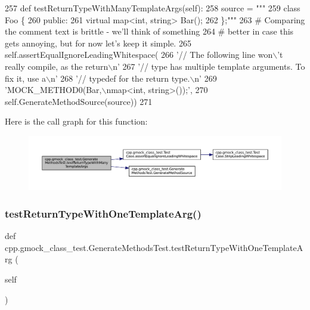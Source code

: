 \begin{DoxyCode}
257   \textcolor{keyword}{def }testReturnTypeWithManyTemplateArgs(self):
258     source = \textcolor{stringliteral}{"""}
259 \textcolor{stringliteral}{class Foo \{}
260 \textcolor{stringliteral}{ public:}
261 \textcolor{stringliteral}{  virtual map<int, string> Bar();}
262 \textcolor{stringliteral}{\};"""}
263     \textcolor{comment}{# Comparing the comment text is brittle - we'll think of something}
264     \textcolor{comment}{# better in case this gets annoying, but for now let's keep it simple.}
265     self.assertEqualIgnoreLeadingWhitespace(
266         \textcolor{stringliteral}{'// The following line won\(\backslash\)'t really compile, as the return\(\backslash\)n'}
267         \textcolor{stringliteral}{'// type has multiple template arguments.  To fix it, use a\(\backslash\)n'}
268         \textcolor{stringliteral}{'// typedef for the return type.\(\backslash\)n'}
269         \textcolor{stringliteral}{'MOCK\_METHOD0(Bar,\(\backslash\)nmap<int, string>());'},
270         self.GenerateMethodSource(source))
271 
\end{DoxyCode}
Here is the call graph for this function\+:
\nopagebreak
\begin{figure}[H]
\begin{center}
\leavevmode
\includegraphics[width=350pt]{classcpp_1_1gmock__class__test_1_1GenerateMethodsTest_affdc748928d26be259345ed6a8753988_cgraph}
\end{center}
\end{figure}
\mbox{\label{classcpp_1_1gmock__class__test_1_1GenerateMethodsTest_a747b7b1b9da071eb8e1e2b84c7ee3614}} 
\subsubsection{\texorpdfstring{test\+Return\+Type\+With\+One\+Template\+Arg()}{testReturnTypeWithOneTemplateArg()}}
{\footnotesize\ttfamily def cpp.\+gmock\+\_\+class\+\_\+test.\+Generate\+Methods\+Test.\+test\+Return\+Type\+With\+One\+Template\+Arg (\begin{DoxyParamCaption}\item[{}]{self }\end{DoxyParamCaption})}



